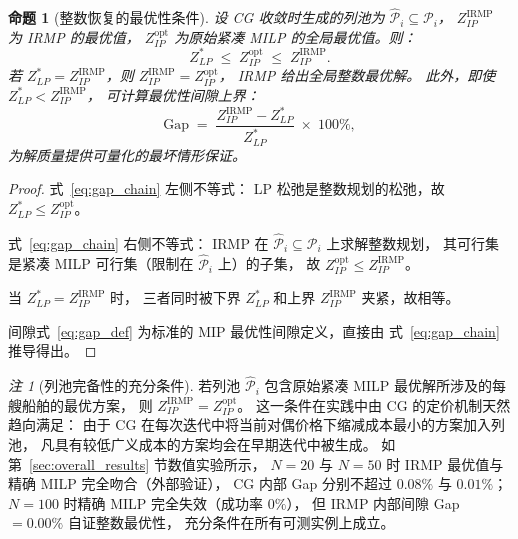 \documentclass[UTF8, a4paper, 12pt]{ctexart}
\theoremstyle{plain}
\newtheorem{proposition}{命题}
\theoremstyle{definition}
\theoremstyle{remark}
\newtheorem{remark}{注}
\begin{document}
\begin{proposition}[整数恢复的最优性条件]
\label{prop:integer_recovery}
设 CG 收敛时生成的列池为 $\hat{\mathcal{P}}_i\subseteq\mathcal{P}_i$，
$Z_{IP}^{\text{IRMP}}$ 为 IRMP 的最优值，
$Z_{IP}^{\text{opt}}$ 为原始紧凑 MILP 的全局最优值。则：
\begin{equation}
  Z_{LP}^* \;\le\; Z_{IP}^{\text{opt}} \;\le\; Z_{IP}^{\text{IRMP}}.
  \label{eq:gap_chain}
\end{equation}
若 $Z_{LP}^* = Z_{IP}^{\text{IRMP}}$，则 $Z_{IP}^{\text{IRMP}} = Z_{IP}^{\text{opt}}$，
IRMP 给出全局整数最优解。
此外，即使 $Z_{LP}^* < Z_{IP}^{\text{IRMP}}$，
可计算最优性间隙上界：
\begin{equation}
  \text{Gap} \;=\; \frac{Z_{IP}^{\text{IRMP}} - Z_{LP}^*}{Z_{LP}^*} \;\times\; 100\%,
  \label{eq:gap_def}
\end{equation}
为解质量提供可量化的最坏情形保证。
\end{proposition}

\begin{proof}
式~\eqref{eq:gap_chain} 左侧不等式：
LP 松弛是整数规划的松弛，故 $Z_{LP}^*\le Z_{IP}^{\text{opt}}$。

式~\eqref{eq:gap_chain} 右侧不等式：
IRMP 在 $\hat{\mathcal{P}}_i\subseteq\mathcal{P}_i$ 上求解整数规划，
其可行集是紧凑 MILP 可行集（限制在 $\hat{\mathcal{P}}_i$ 上）的子集，
故 $Z_{IP}^{\text{opt}}\le Z_{IP}^{\text{IRMP}}$。

当 $Z_{LP}^* = Z_{IP}^{\text{IRMP}}$ 时，
三者同时被下界 $Z_{LP}^*$ 和上界 $Z_{IP}^{\text{IRMP}}$ 夹紧，故相等。

间隙式~\eqref{eq:gap_def} 为标准的 MIP 最优性间隙定义，直接由
式~\eqref{eq:gap_chain} 推导得出。
\end{proof}

\begin{remark}[列池完备性的充分条件]
\label{rem:pool_complete}
若列池 $\hat{\mathcal{P}}_i$ 包含原始紧凑 MILP 最优解所涉及的每艘船舶的最优方案，
则 $Z_{IP}^{\text{IRMP}} = Z_{IP}^{\text{opt}}$。
这一条件在实践中由 CG 的定价机制天然趋向满足：
由于 CG 在每次迭代中将当前对偶价格下缩减成本最小的方案加入列池，
凡具有较低广义成本的方案均会在早期迭代中被生成。
如第~\ref{sec:overall_results} 节数值实验所示，
$N=20$ 与 $N=50$ 时 IRMP 最优值与精确 MILP 完全吻合（外部验证），
CG 内部 Gap 分别不超过 $0.08\%$ 与 $0.01\%$；
$N=100$ 时精确 MILP 完全失效（成功率 $0\%$），
但 IRMP 内部间隙 Gap $= 0.00\%$ 自证整数最优性，
充分条件在所有可测实例上成立。
\end{remark}
\end{document}
